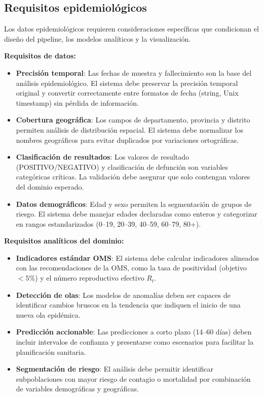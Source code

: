 \documentclass[12pt,a4paper]{article}
\begin{document}
\subsection{\texorpdfstring{Requisitos epidemiológicos}{Requisitos epidemiológicos}}\label{requisitos-epidemioluxf3gicos}

Los datos epidemiológicos requieren consideraciones específicas que condicionan el diseño del pipeline, los modelos analíticos y la visualización.

\textbf{Requisitos de datos:}

\begin{itemize}
    \item \textbf{Precisión temporal}: Las fechas de muestra y fallecimiento son la base del análisis epidemiológico. El sistema debe preservar la precisión temporal original y convertir correctamente entre formatos de fecha (string, Unix timestamp) sin pérdida de información.
    \item \textbf{Cobertura geográfica}: Los campos de departamento, provincia y distrito permiten análisis de distribución espacial. El sistema debe normalizar los nombres geográficos para evitar duplicados por variaciones ortográficas.
    \item \textbf{Clasificación de resultados}: Los valores de resultado (POSITIVO/NEGATIVO) y clasificación de defunción son variables categóricas críticas. La validación debe asegurar que solo contengan valores del dominio esperado.
    \item \textbf{Datos demográficos}: Edad y sexo permiten la segmentación de grupos de riesgo. El sistema debe manejar edades declaradas como enteros y categorizar en rangos estandarizados (0--19, 20--39, 40--59, 60--79, 80+).
\end{itemize}

\textbf{Requisitos analíticos del dominio:}

\begin{itemize}
    \item \textbf{Indicadores estándar OMS}: El sistema debe calcular indicadores alineados con las recomendaciones de la OMS, como la tasa de positividad (objetivo $< 5\%$) y el número reproductivo efectivo $R_t$.
    \item \textbf{Detección de olas}: Los modelos de anomalías deben ser capaces de identificar cambios bruscos en la tendencia que indiquen el inicio de una nueva ola epidémica.
    \item \textbf{Predicción accionable}: Las predicciones a corto plazo (14--60 días) deben incluir intervalos de confianza y presentarse como escenarios para facilitar la planificación sanitaria.
    \item \textbf{Segmentación de riesgo}: El análisis debe permitir identificar subpoblaciones con mayor riesgo de contagio o mortalidad por combinación de variables demográficas y geográficas.
\end{itemize}
\end{document}

